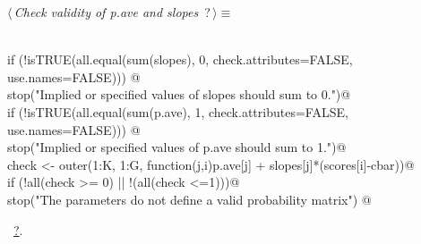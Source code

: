 \documentclass[reqno]{amsart}
\renewcommand{\NWtarget}[2]{\hypertarget{#1}{#2}}
\renewcommand{\NWlink}[2]{\hyperlink{#1}{#2}}
\begin{document}
\begin{flushleft} \small\label{scrap21}\raggedright\small
\NWtarget{nuweb?}{} $\langle\,${\itshape Check validity of p.ave and slopes}\nobreak\ {\footnotesize {?}}$\,\rangle\equiv$
\vspace{-1ex}
\begin{list}{}{} \item
\mbox{}\verb@@\\
\mbox{}\verb@  if (!isTRUE(all.equal(sum(slopes), 0, check.attributes=FALSE, use.names=FALSE))) @\\
\mbox{}\verb@      stop("Implied or specified values of slopes should sum to 0.")@\\
\mbox{}\verb@  if (!isTRUE(all.equal(sum(p.ave), 1, check.attributes=FALSE, use.names=FALSE))) @\\
\mbox{}\verb@      stop("Implied or specified values of p.ave should sum to 1.")@\\
\mbox{}\verb@  check <- outer(1:K, 1:G, function(j,i)p.ave[j] + slopes[j]*(scores[i]-cbar))@\\
\mbox{}\verb@  if (!all(check >= 0) || !(all(check <=1)))@\\
\mbox{}\verb@    stop("The parameters do not define a valid probability matrix")  @\\
\mbox{}\verb@@{\NWsep}
\end{list}
\vspace{-1.5ex}
\footnotesize
\begin{list}{}{\setlength{\itemsep}{-\parsep}\setlength{\itemindent}{-\leftmargin}}
\item \NWtxtMacroRefIn\ \NWlink{nuweb?}{?}.

\item{}
\end{list}
\vspace{4ex}
\end{flushleft}
\end{document}
